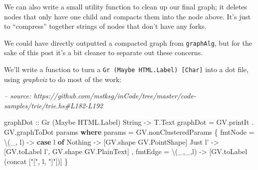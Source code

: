 \documentclass[]{article}
\newenvironment{Shaded}{}{}
\newcommand{\CommentTok}[1]{\textcolor[rgb]{0.38,0.63,0.69}{\textit{#1}}}
\newcommand{\DataTypeTok}[1]{\textcolor[rgb]{0.56,0.13,0.00}{#1}}
\newcommand{\FunctionTok}[1]{\textcolor[rgb]{0.02,0.16,0.49}{#1}}
\newcommand{\KeywordTok}[1]{\textcolor[rgb]{0.00,0.44,0.13}{\textbf{#1}}}
\newcommand{\NormalTok}[1]{#1}
\newcommand{\OtherTok}[1]{\textcolor[rgb]{0.00,0.44,0.13}{#1}}
\newcommand{\StringTok}[1]{\textcolor[rgb]{0.25,0.44,0.63}{#1}}
\begin{document}
We can also write a small utility function to clean up our final graph; it
deletes nodes that only have one child and compacts them into the node above.
It's just to ``compress'' together strings of nodes that don't have any forks.

\begin{Shaded}
\end{Shaded}

We could have directly outputted a compacted graph from \texttt{graphAlg}, but
for the sake of this post it's a bit cleaner to separate out these concerns.

We'll write a function to turn a \texttt{Gr\ (Maybe\ HTML.Label)\ {[}Char{]}}
into a dot file, using \emph{graphviz} to do most of the work:

\begin{Shaded}
\begin{Highlighting}[]
\CommentTok{-- source: https://github.com/mstksg/inCode/tree/master/code-samples/trie/trie.hs#L182-L192}

\NormalTok{graphDot}
\OtherTok{    ::} \DataTypeTok{Gr}\NormalTok{ (}\DataTypeTok{Maybe} \DataTypeTok{HTML.Label}\NormalTok{) }\DataTypeTok{String}
    \OtherTok{->} \DataTypeTok{T.Text}
\NormalTok{graphDot }\FunctionTok{=}\NormalTok{ GV.printIt }\FunctionTok{.}\NormalTok{ GV.graphToDot params}
  \KeywordTok{where}
\NormalTok{    params }\FunctionTok{=}\NormalTok{ GV.nonClusteredParams}
\NormalTok{      \{ fmtNode }\FunctionTok{=}\NormalTok{ \textbackslash{}(_,  l) }\OtherTok{->} \KeywordTok{case}\NormalTok{ l }\KeywordTok{of}
          \DataTypeTok{Nothing} \OtherTok{->}\NormalTok{ [GV.shape }\DataTypeTok{GV.PointShape}\NormalTok{]}
          \DataTypeTok{Just}\NormalTok{ l' }\OtherTok{->}\NormalTok{ [GV.toLabel l', GV.shape }\DataTypeTok{GV.PlainText}\NormalTok{]}
\NormalTok{      , fmtEdge }\FunctionTok{=}\NormalTok{ \textbackslash{}(_,_,l) }\OtherTok{->}\NormalTok{ [GV.toLabel (concat [}\StringTok{"["}\NormalTok{, l, }\StringTok{"]"}\NormalTok{])]}
\NormalTok{      \}}
\end{Highlighting}
\end{Shaded}
\end{document}
